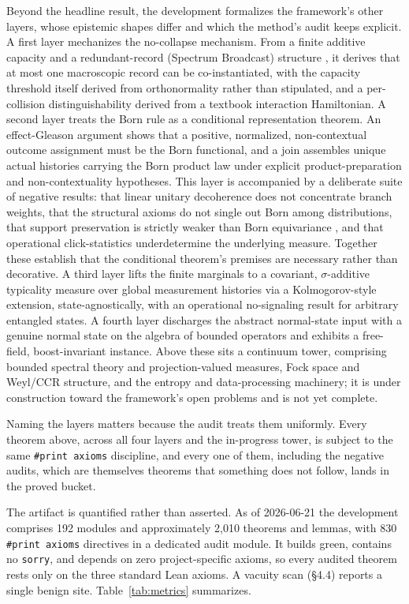 \documentclass[11pt]{article}
\begin{document}
Beyond the headline result, the development formalizes the framework's other layers, whose epistemic
shapes differ and which the method's audit keeps explicit. A
first layer mechanizes the no-collapse mechanism. From a finite additive capacity and a
redundant-record (Spectrum Broadcast) structure \cite{r45}, it derives that at most one macroscopic
record can be co-instantiated, with the capacity threshold itself derived from orthonormality rather
than stipulated, and a per-collision distinguishability derived from a textbook interaction
Hamiltonian. A second layer treats the Born rule as a conditional representation theorem. An
effect-Gleason argument \cite{r35,r36} shows that a positive, normalized, non-contextual outcome
assignment must be the Born functional, and
a join assembles unique actual histories carrying the Born product law under explicit
product-preparation and non-contextuality hypotheses. This layer is accompanied by a deliberate suite
of negative results: that linear unitary decoherence does not concentrate branch weights, that the
structural axioms do not single out Born among distributions, that support preservation is strictly
weaker than Born equivariance \cite{r37}, and that operational click-statistics underdetermine the
underlying measure. Together these establish that the conditional theorem's premises are necessary rather than
decorative. A third layer lifts the finite marginals to a covariant, $\sigma$-additive typicality
measure over global measurement histories via a Kolmogorov-style extension, state-agnostically, with
an operational no-signaling result for arbitrary entangled states. A fourth layer discharges the
abstract normal-state input with a genuine normal state on the algebra of bounded operators and
exhibits a free-field, boost-invariant instance. Above these sits a continuum tower, comprising
bounded spectral theory and projection-valued measures, Fock space and Weyl/CCR structure, and the
entropy and data-processing machinery; it is under construction toward the framework's open problems
and is not yet complete.

Naming the layers matters because the audit treats them uniformly. Every theorem above, across all
four layers and the in-progress tower, is subject to the same \texttt{\#print axioms} discipline, and
every one of them, including the negative audits, which are themselves theorems that something does
not follow, lands in the proved bucket.

The artifact is quantified rather than asserted. As of 2026-06-21 the development comprises 192 modules
and approximately 2{,}010 theorems and lemmas, with 830 \texttt{\#print axioms} directives in a
dedicated audit module. It builds green, contains no \texttt{sorry}, and depends on zero
project-specific axioms, so every audited theorem rests only on the three standard Lean axioms. A
vacuity scan (\S4.4) reports a single benign site. Table~\ref{tab:metrics} summarizes.
\end{document}
